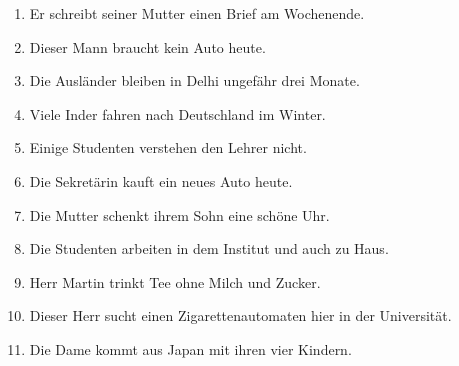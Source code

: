 \documentclass[12pt]{article}
\begin{document}
\begin{enumerate}
\item Er schreibt seiner Mutter einen Brief am Wochenende.
\item Dieser Mann braucht kein Auto heute.
\item Die Ausländer bleiben in Delhi ungefähr drei Monate.
\item Viele Inder fahren nach Deutschland im Winter.
\item Einige Studenten verstehen den Lehrer nicht.
\item Die Sekretärin kauft ein neues Auto heute.
\item Die Mutter schenkt ihrem Sohn eine schöne Uhr.
\item Die Studenten arbeiten in dem Institut und auch zu Haus.
\item Herr Martin trinkt Tee ohne Milch und Zucker.
\item Dieser Herr sucht einen Zigarettenautomaten hier in der Universität.
\item Die Dame kommt aus Japan mit ihren vier Kindern.
\end{enumerate}
\end{document}
